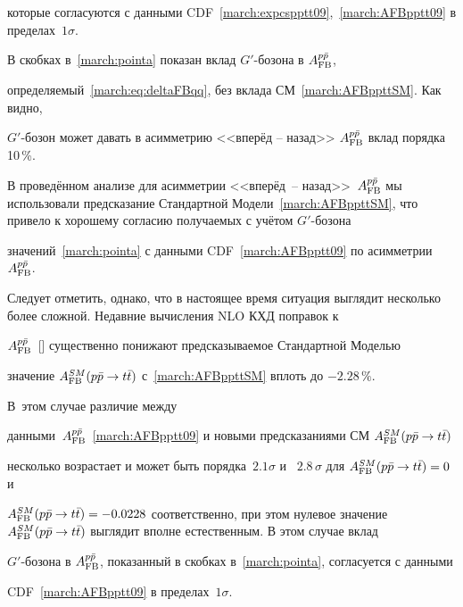 которые согласуются с данными CDF~\eqref{march:expcspptt09},~\eqref{march:AFBpptt09} в пределах~$1 \sigma$.







В скобках в~\eqref{march:pointa} показан вклад $G'$-бозона в $A_{\rm FB}^{p \bar p}$,

определяемый~\eqref{march:eq:deltaFBqq}, без вклада СМ~\eqref{march:AFBppttSM}. Как видно,

 $G'$-бозон может давать в асимметрию <<вперёд -- назад>> $A_{\rm FB}^{p \bar p}$ вклад порядка 10\,\%.





В проведённом анализе для асимметрии <<вперёд~-- назад>>~$A_{\rm FB}^{p \bar p}$ мы исполь\-зовали пред\-ска\-за\-ние Стандартной Модели~\eqref{march:AFBppttSM}, что привело к хорошему согласию получаемых с учётом $G'$-бозона

значений~\eqref{march:pointa} с данными CDF~\eqref{march:AFBpptt09} по асимметрии~$A_{\rm FB}^{p \bar p}$.

Следует отметить, однако, что в настоящее время ситуация выглядит несколько более сложной. Недавние вычисления NLO КХД поправок к

$A_{\rm FB}^{p \bar p}$~[] существенно понижают предсказываемое Стандартной Моделью

значение $A_{\rm FB}^{SM}(p \bar p \to t \bar t )$ с~\eqref{march:AFBppttSM} вплоть до  $-2.28\,\%$. 

В~этом случае различие между

данными~$A_{\rm FB}^{p \bar p}$~\eqref{march:AFBpptt09} и новыми предсказаниями СМ $A_{\rm FB}^{SM}(p \bar p \to t \bar t )$

несколько возрастает и может быть порядка~$2.1 \sigma$ и ~$2.8 \, \sigma$ для \mbox{$A_{\rm FB}^{SM}(p \bar p \to t \bar t ) = 0 $} и

$A_{\rm FB}^{SM}(p \bar p \to t \bar t ) = - 0.0228 $ соответственно, при этом нулевое значение \linebreak \mbox{$A_{\rm FB}^{SM}(p \bar p \to t \bar t )$} выглядит вполне естественным. В этом случае вклад

 $G'$-бозона в  $A_{\rm FB}^{p \bar p}$, показанный в скобках в~\eqref{march:pointa}, согласуется с данными

 CDF~\eqref{march:AFBpptt09} в пределах~$1 \sigma$.



